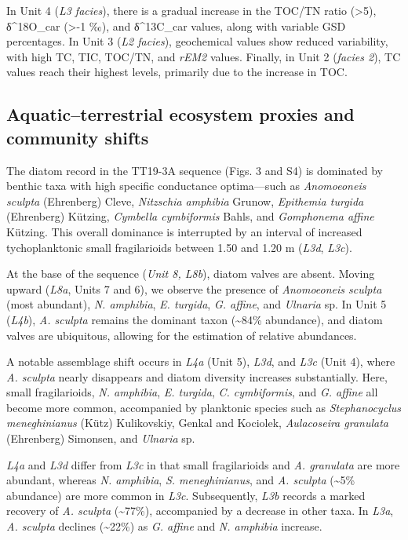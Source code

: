\documentclass[
]{article}
\begin{document}
In Unit 4 (\emph{L3 facies}), there is a gradual increase in the TOC/TN
ratio (\textgreater5), δ\^{}18O\_car (\textgreater-1 ‰), and
δ\^{}13C\_car values, along with variable GSD percentages. In Unit 3
(\emph{L2 facies}), geochemical values show reduced variability, with
high TC, TIC, TOC/TN, and \emph{rEM2} values. Finally, in Unit 2
(\emph{facies 2}), TC values reach their highest levels, primarily due
to the increase in TOC.

\subsection{Aquatic--terrestrial ecosystem proxies and community
shifts}\label{aquaticterrestrial-ecosystem-proxies-and-community-shifts}

The diatom record in the TT19-3A sequence (Figs. 3 and S4) is dominated
by benthic taxa with high specific conductance optima---such as
\emph{Anomoeoneis sculpta} (Ehrenberg) Cleve, \emph{Nitzschia amphibia}
Grunow, \emph{Epithemia turgida} (Ehrenberg) Kützing, \emph{Cymbella
cymbiformis} Bahls, and \emph{Gomphonema affine} Kützing. This overall
dominance is interrupted by an interval of increased tychoplanktonic
small fragilarioids between 1.50 and 1.20 m (\emph{L3d}, \emph{L3c}).

At the base of the sequence (\emph{Unit 8, L8b}), diatom valves are
absent. Moving upward (\emph{L8a}, Units 7 and 6), we observe the
presence of \emph{Anomoeoneis sculpta} (most abundant), \emph{N.
amphibia}, \emph{E. turgida}, \emph{G. affine}, and \emph{Ulnaria} sp.
In Unit 5 (\emph{L4b}), \emph{A. sculpta} remains the dominant taxon
(\textasciitilde84\% abundance), and diatom valves are ubiquitous,
allowing for the estimation of relative abundances.

A notable assemblage shift occurs in \emph{L4a} (Unit 5), \emph{L3d},
and \emph{L3c} (Unit 4), where \emph{A. sculpta} nearly disappears and
diatom diversity increases substantially. Here, small fragilarioids,
\emph{N. amphibia}, \emph{E. turgida}, \emph{C. cymbiformis}, and
\emph{G. affine} all become more common, accompanied by planktonic
species such as \emph{Stephanocyclus meneghinianus} (Kütz) Kulikovskiy,
Genkal and Kociolek, \emph{Aulacoseira granulata} (Ehrenberg) Simonsen,
and \emph{Ulnaria} sp.

\emph{L4a} and \emph{L3d} differ from \emph{L3c} in that small
fragilarioids and \emph{A. granulata} are more abundant, whereas
\emph{N. amphibia}, \emph{S. meneghinianus}, and \emph{A. sculpta}
(\textasciitilde5\% abundance) are more common in \emph{L3c}.
Subsequently, \emph{L3b} records a marked recovery of \emph{A. sculpta}
(\textasciitilde77\%), accompanied by a decrease in other taxa. In
\emph{L3a}, \emph{A. sculpta} declines (\textasciitilde22\%) as \emph{G.
affine} and \emph{N. amphibia} increase.
\end{document}
